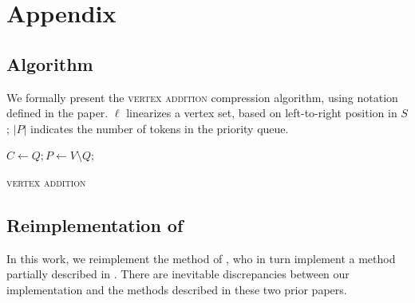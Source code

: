 \appendix

\section{Appendix}

\subsection{Algorithm}
We formally present the \textsc{vertex addition} compression algorithm, using notation defined in the paper. $\ell$ linearizes a vertex set, based on left-to-right position in $S$; $|P|$ indicates the number of tokens in the priority queue.

\begin{algorithm}[]
\SetAlgoLined
{}
 $ C \gets Q;  P \gets V \setminus Q$; \\
 \caption{\textsc{vertex addition}}
\end{algorithm}\label{a:algo}

\subsection{Reimplementation of \citet{filippova2013overcoming}}

In this work, we reimplement the method of \citet{filippova2013overcoming}, who in turn implement a method partially described in \citet{filippova2008dependency}.  There are inevitable discrepancies between our implementation and the methods described in these two prior papers.

